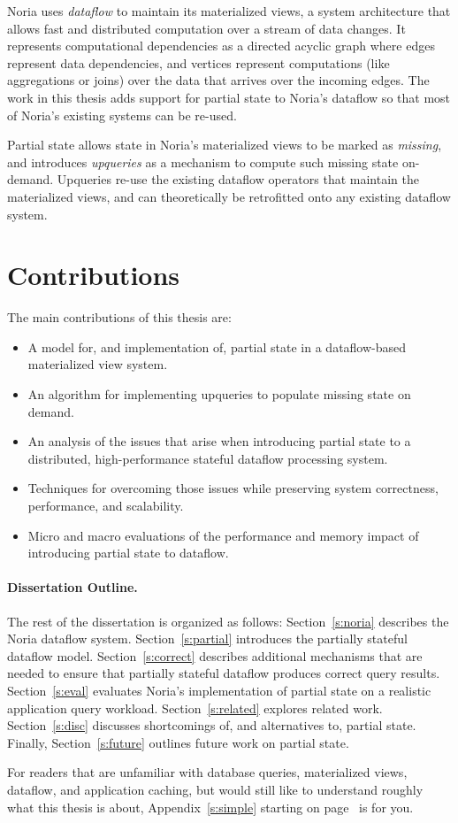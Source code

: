 Noria uses \textit{dataflow} to maintain its materialized views, a system
architecture that allows fast and distributed computation over a stream of data
changes. It represents computational dependencies as a directed acyclic graph
where edges represent data dependencies, and vertices represent computations
(like aggregations or joins) over the data that arrives over the incoming edges.
The work in this thesis adds support for partial state to Noria's dataflow so
that most of Noria's existing systems can be re-used.

Partial state allows state in Noria's materialized views to be marked as
\textit{missing}, and introduces \textit{upqueries} as a mechanism to compute
such missing state on-demand. Upqueries re-use the existing dataflow operators
that maintain the materialized views, and can theoretically be retrofitted onto
any existing dataflow system.

\section{Contributions}

The main contributions of this thesis are:

\begin{itemize}
 \item A model for, and implementation of, partial state in a dataflow-based
   materialized view system.
 \item An algorithm for implementing upqueries to populate missing state on
   demand.
 \item An analysis of the issues that arise when introducing partial state to a
   distributed, high-performance stateful dataflow processing system.
 \item Techniques for overcoming those issues while preserving system
	 correctness, performance, and scalability.
 \item Micro and macro evaluations of the performance and memory impact of
	 introducing partial state to dataflow.
\end{itemize}

\paragraph{Dissertation Outline.}

The rest of the dissertation is organized as follows: Section~\ref{s:noria}
describes the Noria dataflow system. Section~\ref{s:partial} introduces the
partially stateful dataflow model. Section~\ref{s:correct} describes additional
mechanisms that are needed to ensure that partially stateful dataflow produces
correct query results. Section~\ref{s:eval} evaluates Noria's implementation of
partial state on a realistic application query workload. Section~\ref{s:related}
explores related work. Section~\ref{s:disc} discusses shortcomings of, and
alternatives to, partial state. Finally, Section~\ref{s:future} outlines future
work on partial state.

For readers that are unfamiliar with database queries, materialized views,
dataflow, and application caching, but would still like to understand roughly
what this thesis is about, Appendix~\ref{s:simple} starting on
page~\pageref{s:simple} is for you.
